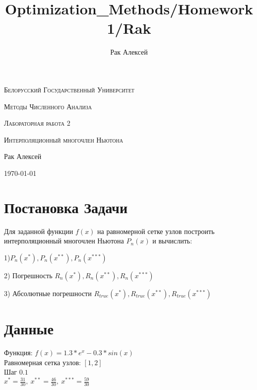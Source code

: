 \documentclass[10pt]{scrartcl}
\begin{document}
\author{Рак Алексей}
\title{Optimization_Methods/Homework1/Rak}
\begin{titlepage}
		\centering
		{\scshape\LARGE Белорусский Государственный Университет \par}
        \vfill
        {\scshape\LARGE Методы Численного Анализа\par}
        \vspace{1cm}
        {\scshape\LARGE Лабораторная работа 2\par}
        \vspace{1cm}
        {\scshape\LARGE Интерполяционный многочлен Ньютона\par}
        \vspace{2cm}
        {\LARGE Рак Алексей\par}
        \vfill
        {\large \today}
\end{titlepage}
\section*{Постановка Задачи}\noindent
Для заданной функции $f(x)$ на равномерной сетке узлов построить интерполяционный многочлен Ньютона $P_n(x)$ и вычислить:

1)$P_n(x^*), P_n(x^{**}), P_n(x^{***})$

2) Погрешность $R_n(x^{*}), R_n(x^{**}), R_n(x^{***})$

3) Абсолютные погрешности $R_{true}(x^*), R_{true}(x^{**}), R_{true}(x^{***})$

\section*{Данные}\noindent
Функция: $f(x) = 1.3 * e^x - 0.3 * sin(x)$\\
Равномерная сетка узлов: $[1, 2]$\\
Шаг $0.1$\\
$x^{*} = \frac{31}{30}, \ x^{**} = \frac{46}{30}, \ x^{***} = \frac{59}{30}$
\end{document}

